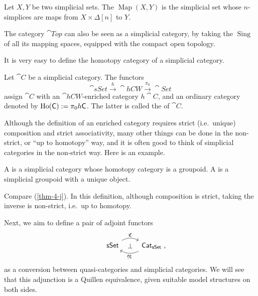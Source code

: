 \begin{definition} \label{def-4-map}
    Let $X,Y$ be two simplicial sets.
    The  $\operatorname{Map}(X,Y)$
    is the simplicial set whose $n$-simplices are maps
    from $X\times\Delta[n]$ to $Y$.
\end{definition}

The category $\cat{Top}$ can also be seen as a simplicial category,
by taking the $\operatorname{Sing}$ of all its mapping spaces,
equipped with the compact open topology.

It is very easy to define the homotopy category of a simplicial category.

\begin{construction}
    Let $\cat C$ be a simplicial category. The functors
    \[ \cat{sSet}\xrightarrow{h}\cat{hCW}\xrightarrow{\pi_0}\cat{Set} \]
    assign $\cat C$ with an $\cat{hCW}$-enriched category $h\cat C$,
    and an ordinary category denoted by $\operatorname{Ho}(\textup{\textsf{C}}):=\pi_0h\textup{\textsf{C}}$.
    The latter is called the  of $\cat C$. \varqed
\end{construction}

Although the definition of an enriched category requires
strict (i.e.\ unique) composition and strict associativity,
many other things can be done in the non-strict, or ``up to homotopy'' way,
and it is often good to think of simplicial categories in the non-strict way.
Here is an example.

\begin{definition}
    A  is a simplicial category
    whose homotopy category is a groupoid.
    A  is a simplicial groupoid with a unique object.
\end{definition}

Compare (\ref{thm-4-j}).
In this definition, although composition is strict,
taking the inverse is non-strict, i.e.\ up to homotopy.

Next, we aim to define a pair of adjoint functors
\[\begin{tikzcd}
    \cat{sSet}\ar[r,bend left,"\mathfrak C"]\ar[r,phantom,"\bot"] &
    \rlap{$\cat{Cat}_{\cat{sSet}}$\ ,}\phantom{\cat{sSet}}\ar[l,bend left,"\mathfrak N"]
\end{tikzcd}\]
as a conversion between quasi-categories and simplicial categories.
We will see that this adjunction is a Quillen equivalence,
given suitable model structures on both sides.

